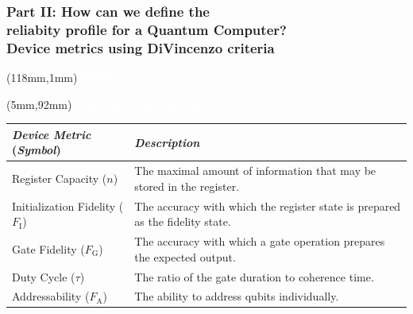 \documentclass[x11names, svgnames]{beamer}
\begin{document}
\begin{frame}
\frametitle{Part II: How can we define the\\ reliabity profile for a Quantum Computer?\\ \small{Device metrics using DiVincenzo criteria}}
\begin{textblock*}{50mm}(118mm,1mm)
\scriptsize
\textcolor{white}{\textbf{IEEE}}
\end{textblock*}
\begin{textblock*}{100mm}(5mm,92mm)
\scriptsize
\textcolor{white}{SOURCE: arXiv: 2008.09612}
\end{textblock*}
\vspace{0.1in}

\begin{table}[ht]
    \centering
    \begin{tabular}{|p{4cm}|p{6.4cm}|}
        \hline 
        \textit{Device Metric} (\textit{Symbol}) & \textit{Description} \\ \hline
        Register Capacity ($n$) & The maximal amount of information that may be stored in the register.  \\ \hline
        Initialization Fidelity ($F_{\textrm{I}}$) & The accuracy with which the register state is prepared as the fidelity state. \\ \hline
        Gate Fidelity ($F_{\textrm{G}}$) & The accuracy with which a gate operation prepares the expected output. \\ \hline
        Duty Cycle ($\tau$) & The ratio of the gate duration to coherence time. \\ \hline
        Addressability ($F_{\textrm{A}}$) & The ability to address qubits individually. \\ \hline
    \end{tabular}
\end{table}
\end{frame}
\end{document}
